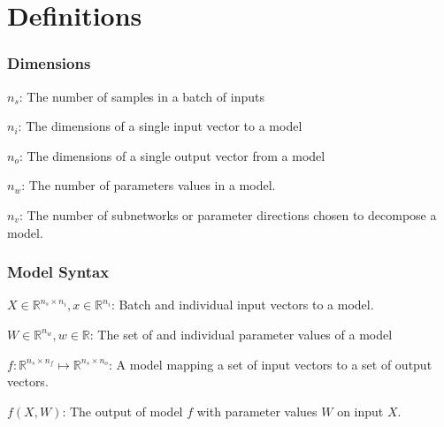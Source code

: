 \documentclass{article}
\theoremstyle{plain}
\theoremstyle{definition}
\theoremstyle{remark}
\begin{document}
\clearpage


\clearpage




\newpage
\appendix
\renewcommand{\thefigure}{S\arabic{figure}}  %
\renewcommand{\theHfigure}{S\arabic{figure}} %
\setcounter{figure}{0}  %
\onecolumn


\section{Definitions}

\subsubsection{Dimensions}
$n_s$: The number of samples in a batch of inputs 

$n_i$: The dimensions of a single input vector to a model

$n_o$: The dimensions of a single output vector from a model

$n_w$: The number of parameters values in a model.

$n_v$: The number of subnetworks or parameter directions chosen to decompose a model. 


\subsubsection{Model Syntax}
$X \in \mathbb{R}^{n_s \times n_i}, x \in \mathbb{R}^{n_i}$: Batch and individual input vectors to a model.

$W \in \mathbb{R}^{n_w}, w \in \mathbb{R}$: The set of and individual parameter values of a model

$f: \mathbb{R}^{n_s \times n_f} \mapsto \mathbb{R}^{n_s \times n_o}$: A model mapping a set of input vectors to a set of output vectors.

$f(X, W)$: The output of model $f$ with parameter values $W$ on input $X$.
\end{document}

